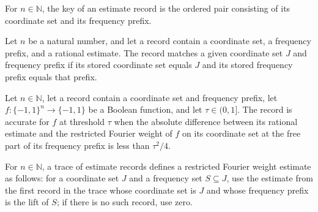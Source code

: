 \begin{definition}
\label{FABL.GoldreichLevinEstimateRecord.key}
\leanok
{}
For $n\in\mathbb N$, the key of an estimate record is the ordered pair consisting of its
coordinate set and its frequency prefix.
\end{definition}

\begin{definition}
\label{FABL.GoldreichLevinEstimateRecord.Matches}
\leanok
{}
Let $n$ be a natural number, and let a record contain a coordinate set, a frequency
prefix, and a rational estimate. The record matches a given coordinate set $J$ and
frequency prefix if its stored coordinate set equals $J$ and its stored frequency prefix
equals that prefix.
\end{definition}

\begin{definition}
\label{FABL.GoldreichLevinEstimateRecord.IsAccurate}
\leanok
{}
Let $n\in\mathbb N$, let a record contain a coordinate set and frequency prefix, let
$f:\{−1,1\}^n\to\{−1,1\}$ be a Boolean function, and let $\tau\in(0,1]$. The record is
accurate for $f$ at threshold $\tau$ when the absolute difference between its rational
estimate and the restricted Fourier weight of $f$ on its coordinate set at the free part
of its frequency prefix is less than $\tau^2/4$.
\end{definition}

\begin{definition}
\label{FABL.goldreichLevinTraceEstimate}
\leanok
{}
For $n\in\mathbb N$, a trace of estimate records defines a restricted Fourier weight
estimate as follows: for a coordinate set $J$ and a frequency set $S\subseteq J$, use
the estimate from the first record in the trace whose coordinate set is $J$ and whose
frequency prefix is the lift of $S$; if there is no such record, use zero.
\end{definition}

